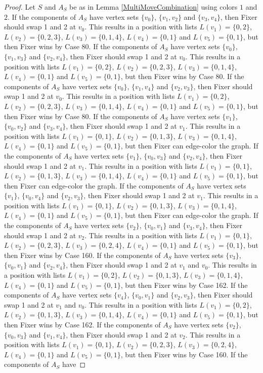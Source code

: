 \documentclass[12pt]{amsart}
\theoremstyle{plain}
\theoremstyle{definition}
\theoremstyle{remark}
\begin{document}
\begin{proof}
Let $S$ and $A_S$ be as in Lemma \ref{MultiMoveCombination} using colors $1$ and $2$. If the components of $A_S$ have vertex sets $\{v_0\}$, $\{v_1, v_2\}$ and $\{v_3, v_4\}$, then Fixer should swap 1 and 2 at $v_0$. This results in a position with lists $L(v_1) = \{0, 2\}$, $L(v_2) = \{0, 2, 3\}$, $L(v_3) = \{0, 1, 4\}$, $L(v_4) = \{0, 1\}$ and $L(v_5) = \{0, 1\}$, but then Fixer wins by Case 80. If the components of $A_S$ have vertex sets $\{v_0\}$, $\{v_1, v_3\}$ and $\{v_2, v_4\}$, then Fixer should swap 1 and 2 at $v_0$. This results in a position with lists $L(v_1) = \{0, 2\}$, $L(v_2) = \{0, 2, 3\}$, $L(v_3) = \{0, 1, 4\}$, $L(v_4) = \{0, 1\}$ and $L(v_5) = \{0, 1\}$, but then Fixer wins by Case 80. If the components of $A_S$ have vertex sets $\{v_0\}$, $\{v_1, v_4\}$ and $\{v_2, v_3\}$, then Fixer should swap 1 and 2 at $v_0$. This results in a position with lists $L(v_1) = \{0, 2\}$, $L(v_2) = \{0, 2, 3\}$, $L(v_3) = \{0, 1, 4\}$, $L(v_4) = \{0, 1\}$ and $L(v_5) = \{0, 1\}$, but then Fixer wins by Case 80. If the components of $A_S$ have vertex sets $\{v_1\}$, $\{v_0, v_2\}$ and $\{v_3, v_4\}$, then Fixer should swap 1 and 2 at $v_1$. This results in a position with lists $L(v_1) = \{0, 1\}$, $L(v_2) = \{0, 1, 3\}$, $L(v_3) = \{0, 1, 4\}$, $L(v_4) = \{0, 1\}$ and $L(v_5) = \{0, 1\}$, but then Fixer can edge-color the graph. If the components of $A_S$ have vertex sets $\{v_1\}$, $\{v_0, v_3\}$ and $\{v_2, v_4\}$, then Fixer should swap 1 and 2 at $v_1$. This results in a position with lists $L(v_1) = \{0, 1\}$, $L(v_2) = \{0, 1, 3\}$, $L(v_3) = \{0, 1, 4\}$, $L(v_4) = \{0, 1\}$ and $L(v_5) = \{0, 1\}$, but then Fixer can edge-color the graph. If the components of $A_S$ have vertex sets $\{v_1\}$, $\{v_0, v_4\}$ and $\{v_2, v_3\}$, then Fixer should swap 1 and 2 at $v_1$. This results in a position with lists $L(v_1) = \{0, 1\}$, $L(v_2) = \{0, 1, 3\}$, $L(v_3) = \{0, 1, 4\}$, $L(v_4) = \{0, 1\}$ and $L(v_5) = \{0, 1\}$, but then Fixer can edge-color the graph. If the components of $A_S$ have vertex sets $\{v_2\}$, $\{v_0, v_1\}$ and $\{v_3, v_4\}$, then Fixer should swap 1 and 2 at $v_2$. This results in a position with lists $L(v_1) = \{0, 1\}$, $L(v_2) = \{0, 2, 3\}$, $L(v_3) = \{0, 2, 4\}$, $L(v_4) = \{0, 1\}$ and $L(v_5) = \{0, 1\}$, but then Fixer wins by Case 160. If the components of $A_S$ have vertex sets $\{v_3\}$, $\{v_0, v_1\}$ and $\{v_2, v_4\}$, then Fixer should swap 1 and 2 at $v_1$ and $v_0$. This results in a position with lists $L(v_1) = \{0, 2\}$, $L(v_2) = \{0, 1, 3\}$, $L(v_3) = \{0, 1, 4\}$, $L(v_4) = \{0, 1\}$ and $L(v_5) = \{0, 1\}$, but then Fixer wins by Case 162. If the components of $A_S$ have vertex sets $\{v_4\}$, $\{v_0, v_1\}$ and $\{v_2, v_3\}$, then Fixer should swap 1 and 2 at $v_1$ and $v_0$. This results in a position with lists $L(v_1) = \{0, 2\}$, $L(v_2) = \{0, 1, 3\}$, $L(v_3) = \{0, 1, 4\}$, $L(v_4) = \{0, 1\}$ and $L(v_5) = \{0, 1\}$, but then Fixer wins by Case 162. If the components of $A_S$ have vertex sets $\{v_2\}$, $\{v_0, v_3\}$ and $\{v_1, v_4\}$, then Fixer should swap 1 and 2 at $v_2$. This results in a position with lists $L(v_1) = \{0, 1\}$, $L(v_2) = \{0, 2, 3\}$, $L(v_3) = \{0, 2, 4\}$, $L(v_4) = \{0, 1\}$ and $L(v_5) = \{0, 1\}$, but then Fixer wins by Case 160. If the components of $A_S$ have 
\end{proof}
\end{document}
